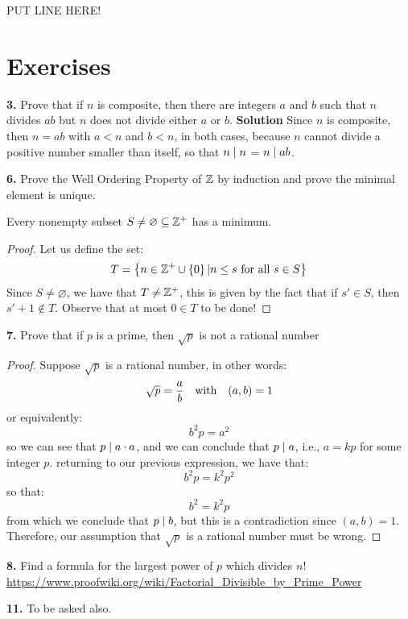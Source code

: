 PUT LINE HERE!
\section{Exercises}
\textbf{3.} Prove that if $n$ is composite, then there are integers $a$ and $b$ such that $n$ divides $ab$ but $n$ does not divide either $a$ or $b$.
\textbf{Solution}
Since $n$ is composite, then $ n = ab$ with $a < n $ and $b < n$, in both cases, because $n$ cannot divide a positive number smaller than itself, so that $ n \mid n$ = $ n \mid ab$.

\textbf{6.} Prove the Well Ordering Property of $ \mathbb{Z} $ by induction and prove the minimal element is unique.
\begin{lem}
	Every nonempty subset $S \neq \varnothing \subseteq \mathbb{Z}^+ $ has a minimum. 
\end{lem}
\begin{proof}
	Let us define the set:
	\[ T = \left\lbrace n \in \mathbb{Z}^+ \cup \left\lbrace 0 \right\rbrace | n \leq s \textrm{ for all } s \in S \right\rbrace \]
	Since $S \neq \varnothing $, we have that  $ T \neq \mathbb{Z}^+$, this is given by the fact that if $ s' \in S $, then $ s' + 1 \not\in T$.
	Observe that at most $ 0 \in T$ to be done!
\end{proof}

\textbf{7.} Prove that if $p$ is a prime, then $ \sqrt{p} $ is not a rational number
\begin{proof}
	Suppose $ \sqrt{p} $ is a rational number, in other words:
	\[ \sqrt{p} = \frac{a}{b} \quad \textrm{with} \quad (a,b) = 1\]
	or equivalently:
	\[ b^2p = a^2 \]
	so we can see that $ p \mid a \cdot a $, and we can conclude that $ p \mid a$, i.e., $ a = kp$ for some integer $p$.
	returning to our previous expression, we have that:
	\[ b^2p = k^2p^2 \]
	so that:
	\[ b^2 = k^2p \]
	from which we conclude that $ p \mid b$, but this is a contradiction since $ (a,b) = 1$. Therefore, our assumption that $\sqrt{p} $ is a rational number must be wrong.
\end{proof}

\textbf{8.} Find a formula for the largest power of $p$ which divides $n!$
\url{https://www.proofwiki.org/wiki/Factorial_Divisible_by_Prime_Power}

\textbf{11.} To be asked also.
